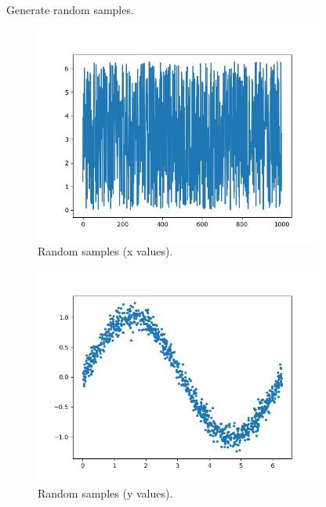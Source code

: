 \begin{frame}
    \begin{listing}[H]
        \caption{Generate random samples.}
        \label{lst:tflite:sinewave:generate_samples}
    \end{listing}
\end{frame}

\begin{frame}
    \begin{figure}
        \includegraphics[width=0.85\textwidth]{images/tflite/colab/x-values.png}
        \caption{Random samples (x values).}
    \end{figure}
\end{frame}

\begin{frame}
    \begin{figure}
        \includegraphics[width=0.85\textwidth]{images/tflite/colab/y-values.png}
        \caption{Random samples (y values).}
    \end{figure}
\end{frame}

